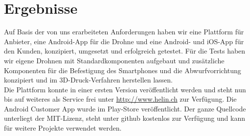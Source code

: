 \section*{Ergebnisse }
Auf Basis der von uns erarbeiteten Anforderungen haben wir eine Plattform für Anbieter, eine Android-App für die Drohne und eine Android- und iOS-App für den Kunden, konzipiert, umgesetzt und erfolgreich getestet. Für die Tests haben wir eigene Drohnen mit Standardkomponenten aufgebaut und zusätzliche Komponenten für die Befestigung des Smartphones und die Abwurfvorrichtung konzipiert und im 3D-Druck-Verfahren herstellen lassen. 
\\
Die Plattform konnte in einer ersten Version veröffentlicht werden und steht nun bis auf weiteres als Service frei unter \url{http://www.helin.ch} zur Verfügung. Die Android Customer App wurde im Play-Store veröffentlicht. Der ganze Quellcode unterliegt der MIT-Lizenz, steht unter github kostenlos zur Verfügung und kann für weitere Projekte verwendet werden.